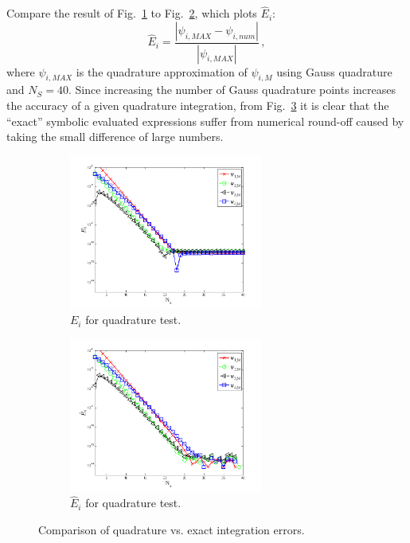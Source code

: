 \documentclass{mc2015}
\newcommand{\fig}[1]{Fig.~\ref{#1}}                      %
\newcommand{\benum}{\begin{equation}} 			%
\newcommand{\eenum}{\end{equation}}
\newcommand{\abs}[1]{\ensuremath{\left\lvert #1 \right\rvert}}
\newcommand{\pec}{\, ,}
\begin{document}
Compare the result of \fig{fig:quad_err} to \fig{fig:no_err}, which plots $\widehat{E}_i$:  
\benum
\widehat{E}_{i} = \frac{\abs{ \psi_{i,MAX} - \psi_{i,num} }}{\abs{\psi_{i,MAX} }} \pec
\eenum
where $\psi_{i,MAX}$ is the quadrature approximation of $\psi_{i,M}$ using Gauss quadrature and $N_S = 40$.
Since increasing the number of Gauss quadrature points increases the accuracy of a given quadrature integration, from \fig{fig:error_comparisons} it is clear that the ``exact'' symbolic evaluated expressions suffer from numerical round-off caused by taking the small difference of large numbers.
%
\begin{figure}[h]
\begin{center}
	\begin{subfigure}{0.45\textwidth}
		\includegraphics[width=2.5in]{err_gauss_to_matlab_exact.png}
		\caption{$E_i$ for quadrature test.}
		\label{fig:quad_err}
	\end{subfigure}
	\begin{subfigure}{0.45\textwidth}
		\includegraphics[width=2.5in]{err_gauss_to_highest_gauss.png}
		\caption{$\widehat{E}_i$ for quadrature test.}
		\label{fig:no_err}
	\end{subfigure}
\caption{Comparison of quadrature vs. exact integration errors.}
\label{fig:error_comparisons}
\end{center}
\end{figure}
\end{document}
